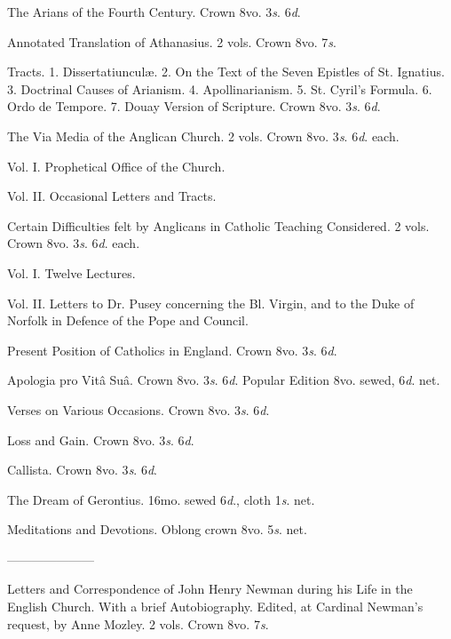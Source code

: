 
The Arians of the Fourth Century. Crown 8vo. 3\emph{s}.
6\emph{d}.

Annotated Translation of Athanasius. 2 vols. Crown
8vo. 7\emph{s}.

Tracts. 1. Dissertatiunculæ. 2. On the Text of the
Seven Epistles of St. Ignatius. 3. Doctrinal Causes of Arianism. 4.
Apollinarianism. 5. St. Cyril's Formula. 6. Ordo de Tempore. 7. Douay
Version of Scripture. Crown 8vo. 3\emph{s}. 6\emph{d}.


The Via Media of the Anglican Church. 2 vols. Crown
8vo. 3\emph{s}. 6\emph{d}. each.

Vol. I. Prophetical Office of the Church.

Vol. II. Occasional Letters and Tracts.

Certain Difficulties felt by Anglicans in Catholic
Teaching Considered. 2 vols. Crown 8vo. 3\emph{s}. 6\emph{d}. each.

Vol. I. Twelve Lectures.

Vol. II. Letters to Dr. Pusey concerning the Bl. Virgin, and to the Duke
of Norfolk in Defence of the Pope and Council.

Present Position of Catholics in England. Crown
8vo. 3\emph{s}. 6\emph{d}.

Apologia pro Vitâ Suâ. Crown 8vo. 3\emph{s}. 6\emph{d}.
Popular Edition 8vo. sewed, 6\emph{d}. net.


Verses on Various Occasions. Crown 8vo. 3\emph{s}.
6\emph{d}.

Loss and Gain. Crown 8vo. 3\emph{s}. 6\emph{d}.

Callista. Crown 8vo. 3\emph{s}. 6\emph{d}.

The Dream of Gerontius. 16mo. sewed 6\emph{d}.,
cloth 1\emph{s}. net.


Meditations and Devotions. Oblong crown 8vo. 5\emph{s}.
net.

———————

Letters and Correspondence of John Henry Newman
during his Life in the English Church. With a brief Autobiography.
Edited, at Cardinal Newman's request, by Anne Mozley. 2 vols. Crown 8vo.
7\emph{s}.


